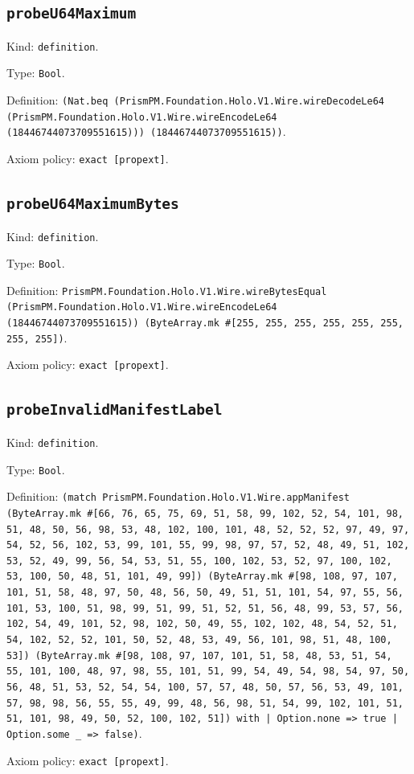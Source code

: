 \documentclass[11pt]{article}
\begin{document}
\subsection*{\texttt{probeU64Maximum}}
\noindent Kind: \texttt{definition}.\par
\noindent Type: \texttt{Bool}.\par
\noindent Definition: \texttt{(Nat.beq (PrismPM.Foundation.Holo.V1.Wire.wireDecodeLe64 (PrismPM.Foundation.Holo.V1.Wire.wireEncodeLe64 (18446744073709551615))) (18446744073709551615))}.\par
\noindent Axiom policy: \texttt{exact [propext]}.\par
\subsection*{\texttt{probeU64MaximumBytes}}
\noindent Kind: \texttt{definition}.\par
\noindent Type: \texttt{Bool}.\par
\noindent Definition: \texttt{PrismPM.Foundation.Holo.V1.Wire.wireBytesEqual (PrismPM.Foundation.Holo.V1.Wire.wireEncodeLe64 (18446744073709551615)) (ByteArray.mk \#[255, 255, 255, 255, 255, 255, 255, 255])}.\par
\noindent Axiom policy: \texttt{exact [propext]}.\par
\subsection*{\texttt{probeInvalidManifestLabel}}
\noindent Kind: \texttt{definition}.\par
\noindent Type: \texttt{Bool}.\par
\noindent Definition: \texttt{(match PrismPM.Foundation.Holo.V1.Wire.appManifest (ByteArray.mk \#[66, 76, 65, 75, 69, 51, 58, 99, 102, 52, 54, 101, 98, 51, 48, 50, 56, 98, 53, 48, 102, 100, 101, 48, 52, 52, 52, 97, 49, 97, 54, 52, 56, 102, 53, 99, 101, 55, 99, 98, 97, 57, 52, 48, 49, 51, 102, 53, 52, 49, 99, 56, 54, 53, 51, 55, 100, 102, 53, 52, 97, 100, 102, 53, 100, 50, 48, 51, 101, 49, 99]) (ByteArray.mk \#[98, 108, 97, 107, 101, 51, 58, 48, 97, 50, 48, 56, 50, 49, 51, 51, 101, 54, 97, 55, 56, 101, 53, 100, 51, 98, 99, 51, 99, 51, 52, 51, 56, 48, 99, 53, 57, 56, 102, 54, 49, 101, 52, 98, 102, 50, 49, 55, 102, 102, 48, 54, 52, 51, 54, 102, 52, 52, 101, 50, 52, 48, 53, 49, 56, 101, 98, 51, 48, 100, 53]) (ByteArray.mk \#[98, 108, 97, 107, 101, 51, 58, 48, 53, 51, 54, 55, 101, 100, 48, 97, 98, 55, 101, 51, 99, 54, 49, 54, 98, 54, 97, 50, 56, 48, 51, 53, 52, 54, 54, 100, 57, 57, 48, 50, 57, 56, 53, 49, 101, 57, 98, 98, 56, 55, 55, 49, 99, 48, 56, 98, 51, 54, 99, 102, 101, 51, 51, 101, 98, 49, 50, 52, 100, 102, 51]) with | Option.none => true | Option.some \_ => false)}.\par
\noindent Axiom policy: \texttt{exact [propext]}.\par
\end{document}
